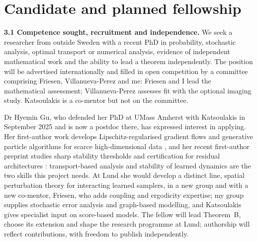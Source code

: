 \documentclass[12pt,a4paper]{article}
\begin{document}
\section{Candidate and planned fellowship}
\textbf{3.1 Competence sought, recruitment and independence.}
We seek a researcher from outside Sweden with a recent PhD in probability, stochastic analysis, optimal transport or numerical analysis, evidence of independent mathematical work and the ability to lead a theorem independently. The position will be advertised internationally and filled in open competition by a committee comprising Friesen, Villanueva-Perez and me: Friesen and I lead the mathematical assessment; Villanueva-Perez assesses fit with the optional imaging study. Katsoulakis is a co-mentor but not on the committee.

Dr Hyemin Gu, who defended her PhD at UMass Amherst with Katsoulakis in September 2025 and is now a postdoc there, has expressed interest in applying. Her first-author work develops Lipschitz-regularised gradient flows and generative particle algorithms for scarce high-dimensional data \cite{GBPRK24}, and her recent first-author preprint studies sharp stability thresholds and certification for residual architectures \cite{GTSK26}: transport-based analysis and stability of learned dynamics are the two skills this project needs. At Lund she would develop a distinct line, spatial perturbation theory for interacting learned samplers, in a new group and with a new co-mentor, Friesen, who adds coupling and ergodicity expertise; my group supplies stochastic error analysis and graph-based modelling, and Katsoulakis gives specialist input on score-based models. The fellow will lead Theorem~B, choose its extension and shape the research programme at Lund; authorship will reflect contributions, with freedom to publish independently.
\end{document}
